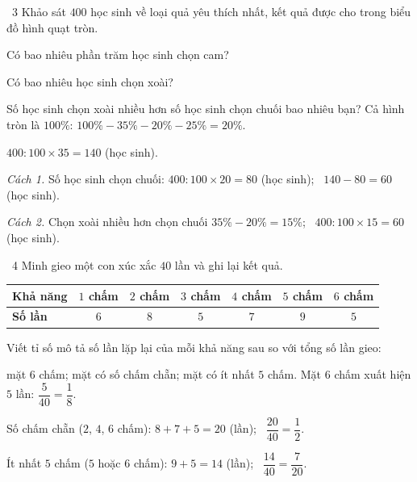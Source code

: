 \begin{exbox}{\ExWord\ 3}
Khảo sát $400$ học sinh về loại quả yêu thích nhất, kết quả được cho trong biểu đồ hình quạt tròn.
\begin{center}
\end{center}
 Có bao nhiêu phần trăm học sinh chọn cam?\par
{} Có bao nhiêu học sinh chọn xoài?\par
{} Số học sinh chọn xoài nhiều hơn số học sinh chọn chuối bao nhiêu bạn?
\guide
{} Cả hình tròn là $100\%$: $100\%-35\%-20\%-25\%=20\%$.\par
{} $400:100\times35=140$ (học sinh).\par
{} \emph{Cách 1.} Số học sinh chọn chuối: $400:100\times20=80$ (học sinh); \ $140-80=60$ (học sinh).\par
\emph{Cách 2.} Chọn xoài nhiều hơn chọn chuối $35\%-20\%=15\%$; \ $400:100\times15=60$ (học sinh).
\end{exbox}
\gap
\begin{exbox}{\ExWord\ 4}
Minh gieo một con xúc xắc $40$ lần và ghi lại kết quả.
\begin{center}
\begin{tabular}{|l|c|c|c|c|c|c|}
\hline
\textbf{Khả năng} & $1$ chấm & $2$ chấm & $3$ chấm & $4$ chấm & $5$ chấm & $6$ chấm\\\hline
\textbf{Số lần} & $6$ & $8$ & $5$ & $7$ & $9$ & $5$\\\hline
\end{tabular}
\end{center}
Viết tỉ số mô tả số lần lặp lại của mỗi khả năng sau so với tổng số lần gieo:\par
{} mặt $6$ chấm; \quad {} mặt có số chấm chẵn; \quad {} mặt có ít nhất $5$ chấm.
\guide
{} Mặt $6$ chấm xuất hiện $5$ lần: $\dfrac{5}{40}=\dfrac{1}{8}$.\par
{} Số chấm chẵn ($2$, $4$, $6$ chấm): $8+7+5=20$ (lần); \ $\dfrac{20}{40}=\dfrac12$.\par
{} Ít nhất $5$ chấm ($5$ hoặc $6$ chấm): $9+5=14$ (lần); \ $\dfrac{14}{40}=\dfrac{7}{20}$.
\end{exbox}
\gap

